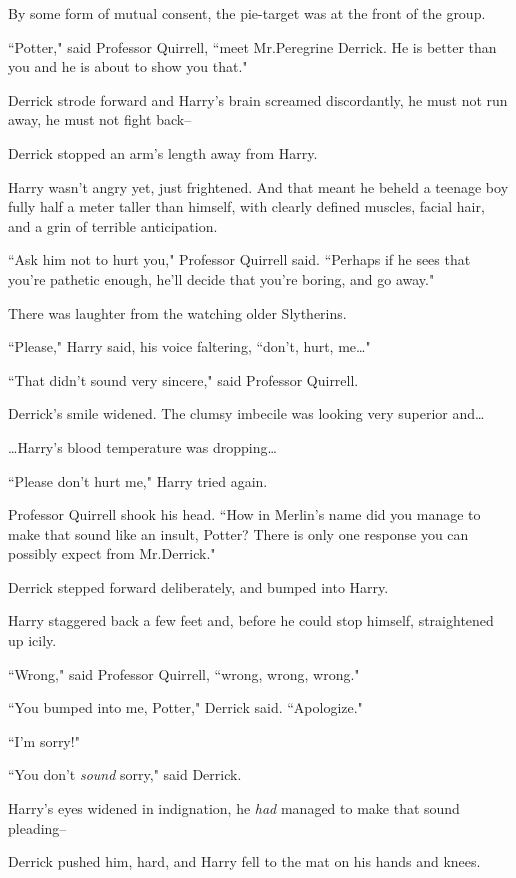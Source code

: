 By some form of mutual consent, the pie-target was at the front of the group.

``Potter," said Professor Quirrell, ``meet Mr.\?Peregrine Derrick. He is better than you and he is about to show you that."

Derrick strode forward and Harry's brain screamed discordantly, he must not run away, he must not fight back\---

Derrick stopped an arm's length away from Harry.

Harry wasn't angry yet, just frightened. And that meant he beheld a teenage boy fully half a meter taller than himself, with clearly defined muscles, facial hair, and a grin of terrible anticipation.

``Ask him not to hurt you," Professor Quirrell said. ``Perhaps if he sees that you're pathetic enough, he'll decide that you're boring, and go away."

There was laughter from the watching older Slytherins.

``Please," Harry said, his voice faltering, ``don't, hurt, me{\ldots}"

``That didn't sound very sincere," said Professor Quirrell.

Derrick's smile widened. The clumsy imbecile was looking very superior and{\ldots}

{\ldots}Harry's blood temperature was dropping{\ldots}

``Please don't hurt me," Harry tried again.

Professor Quirrell shook his head. ``How in Merlin's name did you manage to make that sound like an insult, Potter? There is only one response you can possibly expect from Mr.\?Derrick."

Derrick stepped forward deliberately, and bumped into Harry.

Harry staggered back a few feet and, before he could stop himself, straightened up icily.

``Wrong," said Professor Quirrell, ``wrong, wrong, wrong."

``You bumped into me, Potter," Derrick said. ``Apologize."

``I'm sorry!"

``You don't \emph{sound} sorry," said Derrick.

Harry's eyes widened in indignation, he \emph{had} managed to make that sound pleading\---

Derrick pushed him, hard, and Harry fell to the mat on his hands and knees.

